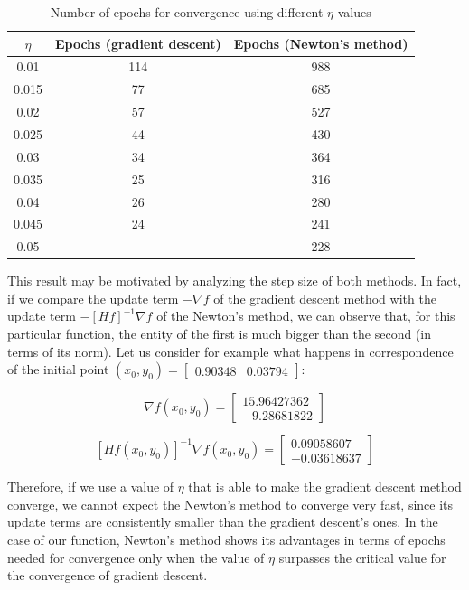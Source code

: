 \documentclass[letterpaper,headings=standardclasses]{scrartcl}
\begin{document}
\begin{table}[h]
\centering
\begin{tabular}{|c|c|c|}
\hline
$\eta$ & Epochs (gradient descent) & Epochs (Newton's method) \\ \hline
0.01 & 114 & 988 \\ \hline
0.015 & 77 & 685 \\ \hline
0.02 & 57 & 527 \\ \hline
0.025 & 44 & 430 \\ \hline
0.03 & 34 & 364 \\ \hline
0.035 & 25 & 316 \\ \hline
0.04 & 26 & 280 \\ \hline
0.045 & 24 & 241 \\ \hline
0.05 & - & 228 \\ \hline
\end{tabular}
\caption{Number of epochs for convergence using different $\eta$ values}
\label{var_eta_res}
\end{table}

This result may be motivated by analyzing the step size of both methods. In fact, if we compare the update term $-\nabla f$ of the gradient descent method with the update term $-[Hf]^{-1} \nabla f$ of the Newton's method, we can observe that, for this particular function, the entity of the first is much bigger than the second (in terms of its norm). Let us consider for example what happens in correspondence of the initial point $ (x_0, y_0) = [\begin{matrix} 0.90348 & 0.03794 \end{matrix}] $:

$$ \nabla f(x_0, y_0) = \left[ \begin{matrix} 15.96427362 \\ -9.28681822 \end{matrix} \right] $$

$$ [Hf(x_0, y_0)]^{-1} \nabla f(x_0, y_0) = \left[ \begin{matrix} 0.09058607 \\ -0.03618637 \end{matrix} \right] $$

Therefore, if we use a value of $\eta$ that is able to make the gradient descent method converge, we cannot expect the Newton's method to converge very fast, since its update terms are consistently smaller than the gradient descent's ones. In the case of our function, Newton's method shows its advantages in terms of epochs needed for convergence only when the value of $\eta$ surpasses the critical value for the convergence of gradient descent.
\end{document}
